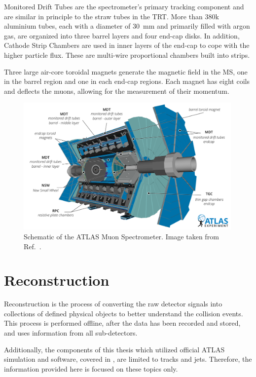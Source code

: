 Monitored Drift Tubes are the spectrometer's primary tracking component and are similar in principle to the straw tubes in the TRT\@.
More than 380k aluminium tubes, each with a diameter of $30$~mm and primarily filled with argon gas, are organized into three barrel layers and four end-cap disks.
In addition, Cathode Strip Chambers are used in inner layers of the end-cap to cope with the higher particle flux.
These are multi-wire proportional chambers built into strips.

Three large air-core toroidal magnets generate the magnetic field in the MS\@, one in the barrel region and one in each end-cap regions.
Each magnet has eight coils and deflects the muons, allowing for the measurement of their momentum.

\begin{figure}[htb]
    \centering
    \includegraphics[width=0.99\textwidth]{Figures/cern_atlas/MS.png}
    \caption{Schematic of the ATLAS Muon Spectrometer. Image taken from Ref.~\cite{ATLASRun3}.}
    \label{fig:atlas_muon_spectrometer}
\end{figure}

\section{Reconstruction}
\label{sec:event_reconstruction}

Reconstruction is the process of converting the raw detector signals into collections of defined physical objects to better understand the collision events.
This process is performed offline, after the data has been recorded and stored, and uses information from all sub-detectors.

Additionally, the components of this thesis which utilized official ATLAS simulation and software, covered in , are limited to tracks and jets.
Therefore, the information provided here is focused on these topics only.

